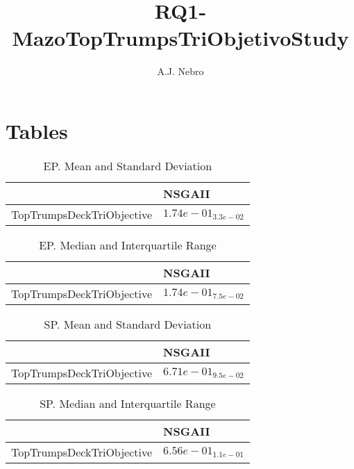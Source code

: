 \documentclass{article}
\title{RQ1-MazoTopTrumpsTriObjetivoStudy}
\author{A.J. Nebro}
\begin{document}
\maketitle
\section{Tables}

\begin{table}
\caption{EP. Mean and Standard Deviation}
\label{table: EP}
\centering
\begin{scriptsize}
\begin{tabular}{ll}
\hline &  NSGAII\\
\hline 
TopTrumpsDeckTriObjective & \cellcolor{gray95}$  1.74e-01_{ 3.3e-02}$ \\
\hline
\end{tabular}
\end{scriptsize}
\end{table}

\begin{table}
\caption{EP. Median and Interquartile Range}
\label{table: EP}
\centering
\begin{scriptsize}
\begin{tabular}{ll}
\hline &  NSGAII\\
\hline 
TopTrumpsDeckTriObjective & \cellcolor{gray95}$  1.74e-01_{ 7.5e-02}$ \\
\hline
\end{tabular}
\end{scriptsize}
\end{table}

\begin{table}
\caption{SP. Mean and Standard Deviation}
\label{table: SP}
\centering
\begin{scriptsize}
\begin{tabular}{ll}
\hline &  NSGAII\\
\hline 
TopTrumpsDeckTriObjective & \cellcolor{gray95}$  6.71e-01_{ 9.5e-02}$ \\
\hline
\end{tabular}
\end{scriptsize}
\end{table}

\begin{table}
\caption{SP. Median and Interquartile Range}
\label{table: SP}
\centering
\begin{scriptsize}
\begin{tabular}{ll}
\hline &  NSGAII\\
\hline 
TopTrumpsDeckTriObjective & \cellcolor{gray95}$  6.56e-01_{ 1.1e-01}$ \\
\hline
\end{tabular}
\end{scriptsize}
\end{table}
\end{document}
